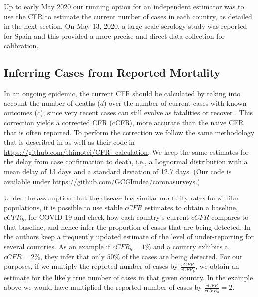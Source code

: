 \documentclass{article}
\newcommand{\cb}[1]{{#1}}
\newcommand{\hh}[1]{{#1}}
\begin{document}
Up to early May 2020 our running option for an independent estimator was to use the CFR to estimate the current number of cases in each country, as detailed in the next section. On May 13, 2020, a large-scale serology study was reported for Spain \cite{ENEcovid19} and this provided a more precise and direct data collection for calibration. 

\subsection{Inferring Cases from Reported Mortality}

In an ongoing epidemic, the current CFR should be calculated by taking into account the number of deaths \hh{($d$)} over the number of current cases with known outcomes \hh{($c$)}, since very recent cases can still evolve as fatalities or recover \cite{nishiura2009early}. This correction yields a corrected CFR (cCFR), more accurate than the naive CFR that is often reported. \cb{To perform the correction we follow the same methodology that is described in \cite{russel2020using} as well as their code in \url{https://github.com/thimotei/CFR_calculation}. We keep the same estimates for the delay from case confirmation to death, i.e., a Lognormal distribution with a mean delay of 13 days and a standard deviation of 12.7 days. (Our code is available under \url{https://github.com/GCGImdea/coronasurveys}.)}

Under the assumption that the disease has similar mortality rates for similar populations, it is possible to use stable $\textit{cCFR}$ estimates to obtain a baseline, $\textit{cCFR}_b$, for COVID-19 and check how each country's current $\textit{cCFR}$ compares to that baseline, and hence infer the proportion of cases that are being detected. \cb{In \cite{russel2020using} the authors keep a frequently updated estimate of the level of under-reporting for several countries. As an example if $\textit{cCFR}_b=1\%$ and a country exhibits a $\textit{cCFR}=2\%$, they infer that only $50\%$ of the cases are being detected.}   
%
\cb{For our purposes, if we multiply the reported number of cases by $\frac{\textit{cCFR}}{\textit{cCFR}_b}$, we obtain an estimate for the likely true number of cases in that given country. In the example above we would have multiplied the reported number of cases by $\frac{\textit{cCFR}}{\textit{cCFR}_b}=2$.}
\end{document}
